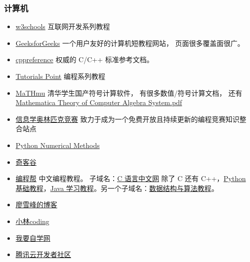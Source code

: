 \subsubsection{计算机}
\begin{itemize}
\item \href{https://www.w3schools.com}{w3schools} 互联网开发系列教程
\item \href{https://www.geeksforgeeks.org/}{GeeksforGeeks} 一个用户友好的计算机短教程网站， 页面很多覆盖面很广。
\item \href{https://cppreference.com}{cppreference} 权威的 C/C++ 标准参考文档。
\item \href{https://www.tutorialspoint.com/index.htm}{Tutorials Point} 编程系列教程
\item \href{http://mathmu.github.io/MTCAS/RecentChanges.html}{MaTHmu} 清华学生国产符号计算软件， 有很多数值/符号计算文档， 还有 \href{https://github.com/maTHmU/MTCAS}{Mathematica Theory of Computer Algebra System.pdf}
\item \href{https://oi-wiki.org}{信息学奥林匹克竞赛} 致力于成为一个免费开放且持续更新的编程竞赛知识整合站点
\item \href{https://pythonnumericalmethods.berkeley.edu/notebooks/Index.html}{Python Numerical Methods}
\item \href{https://www.qikegu.com}{奇客谷}
\item \href{http://www.biancheng.net/}{编程帮} 中文编程教程。 子域名：\href{http://c.biancheng.net}{C 语言中文网} 除了 C 还有 C++，\href{http://c.biancheng.net/python/}{Python 基础教程}，\href{http://c.biancheng.net/java/}{Java 学习教程}。另一个子域名：\href{http://data.biancheng.net/}{数据结构与算法教程}。
\item \href{https://www.liaoxuefeng.com}{廖雪峰的博客}
\item \href{https://xiaolincoding.com}{小林coding}
\item \href{https://www.51zxw.net}{我要自学网}
\item \href{https://cloud.tencent.com/developer}{腾讯云开发者社区}
\end{itemize}

